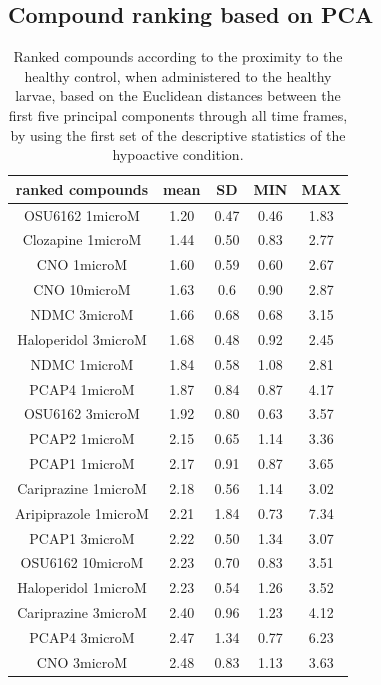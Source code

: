 \documentclass[a4paper,12pt]{article}
\begin{document}
\subsection{Compound ranking based on PCA}
\begin{table}[h!]\tiny
\centering
\caption{Ranked compounds according to the proximity to the healthy control, when administered to the healthy larvae, based on the Euclidean distances between the first five principal components through all time frames, by using the first set of the descriptive statistics of the hypoactive condition.}
\begin{tabular}{|c|c|c|c|c|}
\hline
ranked compounds             & mean & SD   & MIN  & MAX   \\ \hline
OSU6162 1microM       & 1.20  & 0.47 & 0.46 & 1.83  \\ \hline
Clozapine 1microM     & 1.44 & 0.50  & 0.83 & 2.77  \\ \hline
CNO 1microM           & 1.60  & 0.59 & 0.60  & 2.67  \\ \hline
CNO 10microM          & 1.63 & 0.6  & 0.90  & 2.87  \\ \hline
NDMC 3microM          & 1.66 & 0.68 & 0.68 & 3.15  \\ \hline
Haloperidol 3microM   & 1.68 & 0.48 & 0.92 & 2.45  \\ \hline
NDMC 1microM          & 1.84 & 0.58 & 1.08 & 2.81  \\ \hline
PCAP4 1microM       & 1.87 & 0.84 & 0.87 & 4.17  \\ \hline
OSU6162 3microM       & 1.92 & 0.80  & 0.63 & 3.57  \\ \hline
PCAP2 1microM         & 2.15 & 0.65 & 1.14 & 3.36  \\ \hline
PCAP1 1microM         & 2.17 & 0.91 & 0.87 & 3.65  \\ \hline
Cariprazine 1microM   & 2.18 & 0.56 & 1.14 & 3.02  \\ \hline
Aripiprazole 1microM  & 2.21 & 1.84 & 0.73 & 7.34  \\ \hline
PCAP1 3microM         & 2.22 & 0.50  & 1.34 & 3.07  \\ \hline
OSU6162 10microM      & 2.23 & 0.70  & 0.83 & 3.51  \\ \hline
Haloperidol 1microM   & 2.23 & 0.54 & 1.26 & 3.52  \\ \hline
Cariprazine 3microM   & 2.40  & 0.96 & 1.23 & 4.12  \\ \hline
PCAP4 3microM       & 2.47 & 1.34 & 0.77 & 6.23  \\ \hline
CNO 3microM           & 2.48 & 0.83 & 1.13 & 3.63  \\ \hline

\end{tabular}
\end{table}
\end{document}
